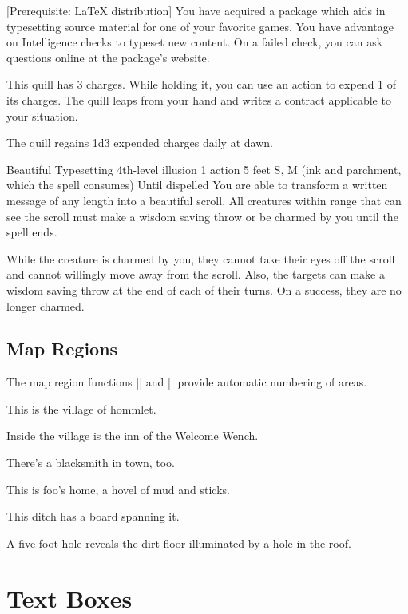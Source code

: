 \documentclass[letterpaper, landscape]{book}
\begin{document}
[Prerequisite: \LaTeX{} distribution]
You have acquired a package which aids in typesetting source material for one of your favorite games. You have advantage on Intelligence checks to typeset new content. On a failed check, you can ask questions online at the package's website.

This quill has 3 charges. While holding it, you can use an action to expend 1 of its charges. The quill leaps from your hand and writes a contract applicable to your situation.

The quill regains 1d3 expended charges daily at dawn.

\DndSpellHeader%
  {Beautiful Typesetting}
  {4th-level illusion}
  {1 action}
  {5 feet}
  {S, M (ink and parchment, which the spell consumes)}
  {Until dispelled}
You are able to transform a written message of any length into a beautiful scroll. All creatures within range that can see the scroll must make a wisdom saving throw or be charmed by you until the spell ends.

While the creature is charmed by you, they cannot take their eyes off the scroll and cannot willingly move away from the scroll. Also, the targets can make a wisdom saving throw at the end of each of their turns. On a success, they are no longer charmed.

\section{Map Regions}
The map region functions |\DndArea| and |\DndSubArea| provide automatic numbering of areas.

This is the village of hommlet.

Inside the village is the inn of the Welcome Wench.

There's a blacksmith in town, too.

This is foo's home, a hovel of mud and sticks.

This ditch has a board spanning it.

A five-foot hole reveals the dirt floor illuminated by a hole in the roof.

\chapter{Text Boxes}
\end{document}
